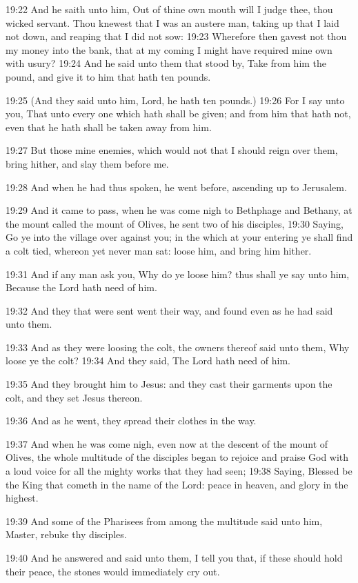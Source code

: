 19:22 And he saith unto him, Out of thine own mouth will I judge thee, thou wicked servant. Thou knewest that I was an austere man, taking up that I laid not down, and reaping that I did not sow: 19:23 Wherefore then gavest not thou my money into the bank, that at my coming I might have required mine own with usury?  19:24 And he said unto them that stood by, Take from him the pound, and give it to him that hath ten pounds.

19:25 (And they said unto him, Lord, he hath ten pounds.)  19:26 For I say unto you, That unto every one which hath shall be given; and from him that hath not, even that he hath shall be taken away from him.

19:27 But those mine enemies, which would not that I should reign over them, bring hither, and slay them before me.

19:28 And when he had thus spoken, he went before, ascending up to Jerusalem.

19:29 And it came to pass, when he was come nigh to Bethphage and Bethany, at the mount called the mount of Olives, he sent two of his disciples, 19:30 Saying, Go ye into the village over against you; in the which at your entering ye shall find a colt tied, whereon yet never man sat: loose him, and bring him hither.

19:31 And if any man ask you, Why do ye loose him? thus shall ye say unto him, Because the Lord hath need of him.

19:32 And they that were sent went their way, and found even as he had said unto them.

19:33 And as they were loosing the colt, the owners thereof said unto them, Why loose ye the colt?  19:34 And they said, The Lord hath need of him.

19:35 And they brought him to Jesus: and they cast their garments upon the colt, and they set Jesus thereon.

19:36 And as he went, they spread their clothes in the way.

19:37 And when he was come nigh, even now at the descent of the mount of Olives, the whole multitude of the disciples began to rejoice and praise God with a loud voice for all the mighty works that they had seen; 19:38 Saying, Blessed be the King that cometh in the name of the Lord: peace in heaven, and glory in the highest.

19:39 And some of the Pharisees from among the multitude said unto him, Master, rebuke thy disciples.

19:40 And he answered and said unto them, I tell you that, if these should hold their peace, the stones would immediately cry out.

